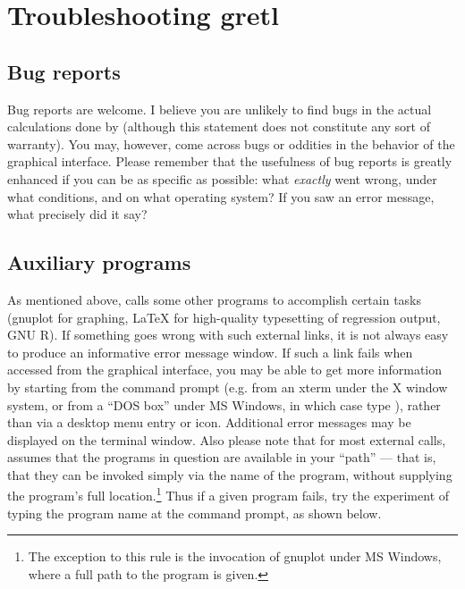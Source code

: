 \chapter{Troubleshooting gretl}
\label{trouble}



\section{Bug reports}
\label{trouble-bugs}


      Bug reports are welcome. I believe you are unlikely to find bugs
      in the actual calculations done by
       (although this statement does
      not constitute any sort of warranty). You may, however, come
      across bugs or oddities in the behavior of the graphical
      interface.  Please remember that the usefulness of bug reports
      is greatly enhanced if you can be as specific as possible: what
      \emph{exactly} went wrong, under what conditions,
      and on what operating system?  If you saw an error message, what
      precisely did it say?

\section{Auxiliary programs}
\label{trouble-programs}


      As mentioned above,  calls some
      other programs to accomplish certain tasks (gnuplot for
      graphing, {\LaTeX} for high-quality typesetting of regression
      output, GNU R).  If something goes wrong with such external
      links, it is not always easy to produce an informative error
      message window.  If such a link fails when accessed from the
       graphical interface, you may be
      able to get more information by starting
       from the command prompt (e.g.
      from an xterm under the X window system, or from a ``DOS
	box'' under MS Windows, in which case type
      ), rather than via a desktop menu
      entry or icon.  Additional error messages may be displayed on
      the terminal window.
      Also please note that for most external calls,
       assumes that the programs in
      question are available in your ``path'' --- that
      is, that they can be invoked simply via the name of the program,
      without supplying the program's full
      location.\footnote{The exception to this rule is the
	  invocation of gnuplot under MS Windows, where a full path to
	  the program is given.}  Thus if a given program fails, try the experiment
      of typing the program name at the command prompt, as shown
      below.

